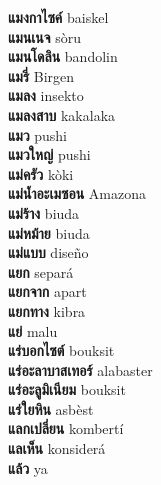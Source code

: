 \textbf{ แมงกาไซค์  } baiskel \\
\textbf{ แมนเนจ  } sòru \\
\textbf{ แมนโดลิน  } bandolin \\
\textbf{ แมรี่  } Birgen \\
\textbf{ แมลง  } insekto \\
\textbf{ แมลงสาบ  } kakalaka \\
\textbf{ แมว  } pushi \\
\textbf{ แมวใหญ่  } pushi \\
\textbf{ แม่ครัว  } kòki \\
\textbf{ แม่น้ำอะเมซอน  } Amazona \\
\textbf{ แม่ร้าง  } biuda \\
\textbf{ แม่หม้าย  } biuda \\
\textbf{ แม่แบบ  } diseño \\
\textbf{ แยก  } separá \\
\textbf{ แยกจาก  } apart \\
\textbf{ แยกทาง  } kibra \\
\textbf{ แย่  } malu \\
\textbf{ แร่บอกไซต์  } bouksit \\
\textbf{ แร่อะลาบาสเทอร์  } alabaster \\
\textbf{ แร่อะลูมิเนียม  } bouksit \\
\textbf{ แร่ใยหิน  } asbèst \\
\textbf{ แลกเปลี่ยน  } kombertí \\
\textbf{ แลเห็น  } konsiderá \\
\textbf{ แล้ว  } ya \\
